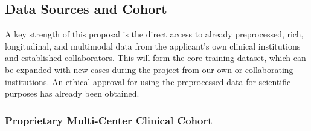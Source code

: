 \documentclass[11pt, a4paper]{article}
\begin{document}
\subsection{Data Sources and Cohort}
A key strength of this proposal is the direct access to already preprocessed, rich, longitudinal, and multimodal data from the applicant's own clinical institutions and established collaborators. This will form the core training dataset, which can be expanded with new cases during the project from our own or collaborating institutions. An ethical approval for using the preprocessed data for scientific purposes has already been obtained.

\subsubsection{Proprietary Multi-Center Clinical Cohort}
\end{document}
